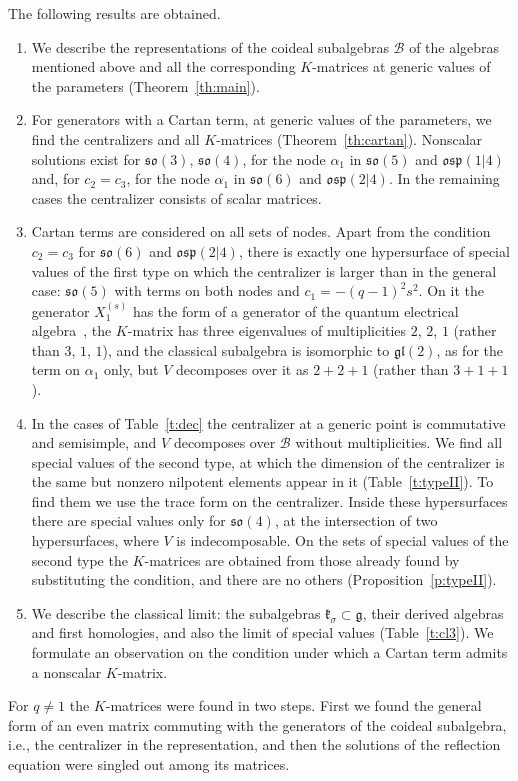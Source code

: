 \documentclass[12pt,a4paper]{article}
\newcommand{\g}{\mathfrak{g}}
\newcommand{\kk}{\mathfrak{k}}
\newcommand{\so}{\mathfrak{so}}
\newcommand{\osp}{\mathfrak{osp}}
\begin{document}
The following results are obtained.
\begin{enumerate}
\item We describe the representations of the coideal subalgebras $\mathcal B$ of the algebras mentioned above and all the corresponding $K$-matrices
at generic values of the parameters (Theorem~\ref{th:main}).
\item For generators with a Cartan term, at generic values of the parameters, we find the centralizers and all $K$-matrices (Theorem~\ref{th:cartan}).
Nonscalar solutions exist for $\so(3)$, $\so(4)$, for the node $\alpha_1$ in $\so(5)$ and $\osp(1|4)$ and, for
$c_2=c_3$, for the node $\alpha_1$ in $\so(6)$ and $\osp(2|4)$. In the remaining cases the centralizer consists of scalar
matrices.
\item Cartan terms are considered on all sets of nodes. Apart from the condition $c_2=c_3$ for $\so(6)$ and $\osp(2|4)$,
there is exactly one hypersurface of special values of the first type on which the centralizer is larger than in the general case:
$\so(5)$ with terms on both nodes and $c_1=-(q-1)^2s^2$. On it the generator $X^{(s)}_1$ has the form of a generator of the quantum electrical algebra~\cite{AMS2}, the $K$-matrix
has three eigenvalues of multiplicities $2$, $2$, $1$ (rather than $3$, $1$, $1$), and the classical subalgebra is isomorphic to
$\mathfrak{gl}(2)$, as for the term on $\alpha_1$ only, but $V$ decomposes over it as $2+2+1$ (rather than $3+1+1$).
\item In the cases of Table~\ref{t:dec} the centralizer at a generic point is commutative and semisimple, and $V$ decomposes
over $\mathcal B$ without multiplicities. We find all special values of the second type, at which the dimension of the centralizer is the same but nonzero nilpotent elements
appear in it (Table~\ref{t:typeII}). To find them we use the trace form on the
centralizer. Inside these hypersurfaces there are special values only for $\so(4)$, at the intersection of two
hypersurfaces, where $V$ is indecomposable. On the sets of special values of the second type the $K$-matrices are obtained from
those already found by substituting the condition, and there are no others (Proposition~\ref{p:typeII}).
\item We describe the classical limit: the subalgebras $\kk_\sigma\subset\g$, their derived algebras and first homologies, and also the
limit of special values (Table~\ref{t:cl3}).
We formulate an observation on the condition under which a Cartan term admits a nonscalar $K$-matrix.
\end{enumerate}
For $q\neq1$ the $K$-matrices were found in two steps. First we found the general form of an even matrix commuting with the generators
of the coideal subalgebra, i.e., the centralizer in the representation, and then the solutions of the reflection equation were singled out among its matrices.
\end{document}
